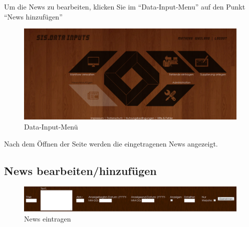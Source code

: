 Um die News zu bearbeiten, klicken Sie im \enquote{Data-Input-Menu} auf den Punkt \enquote{News hinzufügen}
\\
\begin{figure}[H]
\centering
\includegraphics[keepaspectratio=true, width=16cm]{images/screenshots/data-inputs_news.png}
\caption{Data-Input-Menü}
\label{fig:instr_admin_data_inputs_news}
\end{figure}


Nach dem Öffnen der Seite werden die eingetragenen News angezeigt.
\\

\subsection{News bearbeiten/hinzufügen}

\begin{figure}[H]
\centering
\includegraphics[keepaspectratio=true, width=16cm]{images/screenshots/news_inserts.png}
\caption{News eintragen}
\label{fig:instr_admin_news_insert}
\end{figure}


